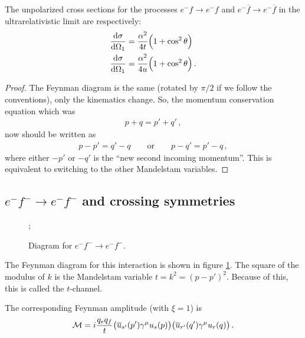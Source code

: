\documentclass[main.tex]{subfiles}
\begin{document}
\begin{claim}
The unpolarized cross sections for the processes \(e^{-} f \to e^{-} f\) and \(e^{-} \overline{f} \to e^{-} \overline{f}\) in the ultrarelativistic limit are respectively: 
%
\begin{align}
\dv{\sigma }{\Omega_1 }
&= \frac{\alpha^2}{4 t} \qty(1 + \cos^2 \theta ) \\
\dv{\sigma }{\Omega_1 }
&= \frac{\alpha^2}{4 u} \qty(1 + \cos^2 \theta )
\,.
\end{align}
\end{claim}

\begin{proof}
The Feynman diagram is the same (rotated by \(\pi /2\) if we follow the conventions), only the kinematics change. 
So, the momentum conservation equation which was 
%
\begin{align}
p + q = p' + q'
\,,
\end{align}
%
now should be written as 
%
\begin{align}
p - p' = q' - q 
\qquad \text{or} \qquad
p - q' = p' - q
\,,
\end{align}
%
where either \(-p'\) or \(-q'\) is the ``new second incoming momentum''. This is equivalent to switching to the other Mandelstam variables.
\end{proof}

\subsection{\(e^{-}f^{-} \to e^{-}f^{-}\) and crossing symmetries}

\begin{figure}[ht]
\centering
{};
\caption{Diagram for \(e^{-}f^{-} \to e^{-}f^{-}\).}
\label{fig:efef-feynman-diagram}
\end{figure}

The Feynman diagram for this interaction is shown in figure \ref{fig:efef-feynman-diagram}. The square of the modulus of \(k\) is the Mandelstam variable \(t = k^2 = (p - p')^2\). 
Because of this, this is called the \(t\)-channel. 

The corresponding Feynman amplitude (with \(\xi = 1\)) is 
%
\begin{align}
\mathcal{M} = i \frac{q_e q_f}{t} 
\qty(\overline{u}_{s'} (p') \gamma^{\mu } u_s (p))
\qty(\overline{u}_{r'} (q') \gamma^{\mu } u_r (q))
\,.
\end{align}
\end{document}
